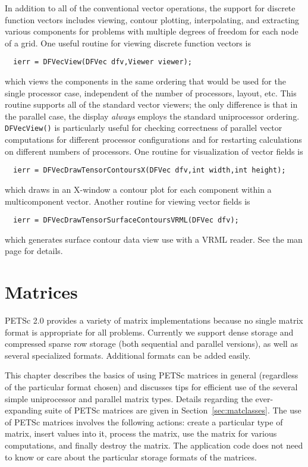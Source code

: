 In addition to all of the conventional vector operations, the support
for discrete function vectors includes viewing, contour plotting,
interpolating, and extracting various components for problems with multiple
degrees of freedom for each node of a grid.  One useful
routine for viewing discrete function vectors is 
\begin{verbatim}
  ierr = DFVecView(DFVec dfv,Viewer viewer);
\end{verbatim}
which views the components in the same ordering that
would be used for the single processor case, independent of the number
of processors, layout, etc.  This routine supports all of the standard
vector viewers; the only difference is that in the parallel case, the
display {\em always} employs the standard uniprocessor ordering.
{\tt DFVecView()} is particularly useful for checking correctness of
parallel vector computations for different processor configurations and
for restarting calculations on different numbers of processors.
One routine for visualization of vector fields is 
\begin{verbatim}
  ierr = DFVecDrawTensorContoursX(DFVec dfv,int width,int height);
\end{verbatim}
which draws in an X-window a contour plot for each component within a multicomponent
vector.
Another routine for viewing vector fields is 
\begin{verbatim}
  ierr = DFVecDrawTensorSurfaceContoursVRML(DFVec dfv);
\end{verbatim}
which generates surface contour data view use with a VRML reader.  See the
man page for details.

\chapter{Matrices}
\label{chapter:matrices}

PETSc 2.0 provides a variety of matrix implementations because no
single matrix format is appropriate for all problems.  Currently we
support dense storage and compressed sparse row storage (both
sequential and parallel versions), as well as several specialized
formats.  Additional formats can be added easily.

This chapter describes the basics of using PETSc matrices in general
(regardless of the particular format chosen) and discusses tips
for efficient use of the several simple uniprocessor and parallel
matrix types.  Details regarding the ever-expanding suite of
PETSc matrices are given in Section~\ref{sec:matclasses}.
The use of PETSc matrices involves the following actions: create a
particular type of matrix, insert values into it, process the matrix,
use the matrix for various computations, and finally destroy the
matrix.  The application code does not need to know or care about the
particular storage formats of the matrices.

